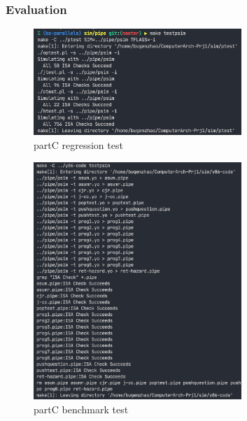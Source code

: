\documentclass{article}
\begin{document}
\subsubsection{Evaluation}
\begin{figure}[H] %
        \centering %
        \includegraphics[width=0.7\textwidth]{partC-regression-test.png} %
        \caption{partC regression test} %
        \label{Fig.partC-regression} %
\end{figure}
\begin{figure}[H] %
        \centering %
        \includegraphics[width=0.7\textwidth]{partC-test2.png} %
        \caption{partC benchmark test} %
        \label{Fig.partC-benchmark} %
\end{figure}
\end{document}
